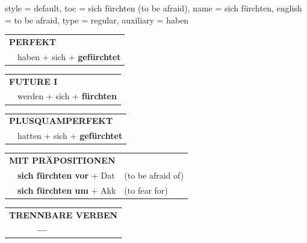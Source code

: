\begin{verbentry}{
  style = {default},
  toc = {sich fürchten (to be afraid)},
  name = {sich fürchten},
  english = {to be afraid},
  type = {regular},
  auxiliary = {haben}
}
 \begin{tabular}{rl}
     \multicolumn{2}{l}{\textbf{PERFEKT}}\\
   & haben + sich + \textbf{gefürchtet}\\
  \end{tabular}
\hfill
   \begin{tabular}{rl}
    \multicolumn{2}{l}{\textbf{FUTURE I} }\\
   & werden + sich + \textbf{fürchten}\\
  \end{tabular}
\hfill
   \begin{tabular}{rl}
      \multicolumn{2}{l}{\textbf{PLUSQUAMPERFEKT}}\\
   & hatten + sich + \textbf{gefürchtet}\\
  \end{tabular}

   \vspace{10pt}

   \begin{tabular}{lll}
      \multicolumn{3}{l}{\textbf{MIT PRÄPOSITIONEN}}\\
& \textbf{sich fürchten vor} + Dat & (to be afraid of)\\
& \textbf{sich fürchten um} + Akk & (to fear for)\\
\end{tabular}
  \hfill
   \begin{tabular}{lll}
\multicolumn{3}{l}{\textbf{TRENNBARE VERBEN}}\\
& \textbf{---} & \\
\end{tabular}

  \vspace{-5pt}
\end{verbentry}


